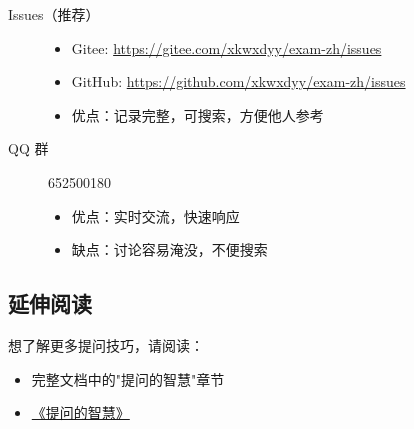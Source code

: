 \begin{description}
  \item[Issues（推荐）]
    \begin{itemize}
      \item Gitee: \url{https://gitee.com/xkwxdyy/exam-zh/issues}
      \item GitHub: \url{https://github.com/xkwxdyy/exam-zh/issues}
      \item 优点：记录完整，可搜索，方便他人参考
    \end{itemize}

  \item[QQ 群] 652500180
    \begin{itemize}
      \item 优点：实时交流，快速响应
      \item 缺点：讨论容易淹没，不便搜索
    \end{itemize}
\end{description}


\subsection{延伸阅读}

想了解更多提问技巧，请阅读：

\begin{itemize}
  \item 完整文档中的"提问的智慧"章节
  \item \href{https://github.com/ryanhanwu/How-To-Ask-Questions-The-Smart-Way}{《提问的智慧》}
\end{itemize}
